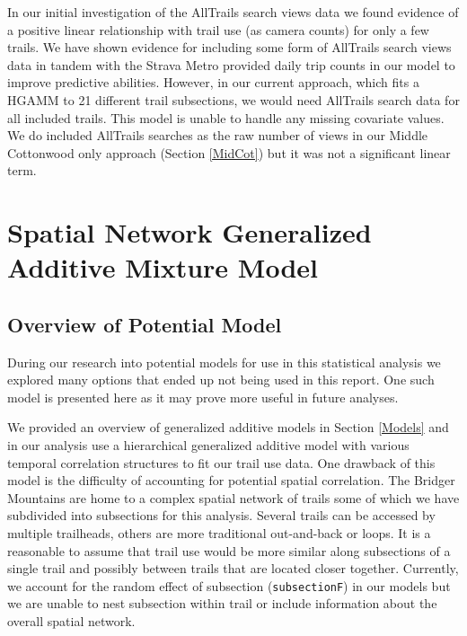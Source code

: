 \documentclass[
]{book}
\begin{document}
In our initial investigation of the AllTrails search views data we found evidence of a positive linear relationship with trail use (as camera counts) for only a few trails. We have shown evidence for including some form of AllTrails search views data in tandem with the Strava Metro provided daily trip counts in our model to improve predictive abilities. However, in our current approach, which fits a HGAMM to 21 different trail subsections, we would need AllTrails search data for all included trails. This model is unable to handle any missing covariate values. We do included AllTrails searches as the raw number of views in our Middle Cottonwood only approach (Section \ref{MidCot}) but it was not a significant linear term.

\hypertarget{Spatial}{%
\chapter{Spatial Network Generalized Additive Mixture Model}\label{Spatial}}

\hypertarget{overview-of-potential-model}{%
\section{Overview of Potential Model}\label{overview-of-potential-model}}

During our research into potential models for use in this statistical analysis we explored many options that ended up not being used in this report. One such model is presented here as it may prove more useful in future analyses.

We provided an overview of generalized additive models in Section \ref{Models} and in our analysis use a hierarchical generalized additive model with various temporal correlation structures to fit our trail use data. One drawback of this model is the difficulty of accounting for potential spatial correlation. The Bridger Mountains are home to a complex spatial network of trails some of which we have subdivided into subsections for this analysis. Several trails can be accessed by multiple trailheads, others are more traditional out-and-back or loops. It is a reasonable to assume that trail use would be more similar along subsections of a single trail and possibly between trails that are located closer together. Currently, we account for the random effect of subsection (\texttt{subsectionF}) in our models but we are unable to nest subsection within trail or include information about the overall spatial network.
\end{document}
